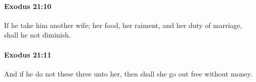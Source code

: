 		\paragraph{Exodus 21:10} %
			\label{EXODUS-21-10}

			If he take him another wife; her food, her raiment, and her duty of marriage, shall he not diminish.


		\paragraph{Exodus 21:11} %
			\label{EXODUS-21-11}

			And if he do not these three unto her, then shall she go out free without money.


